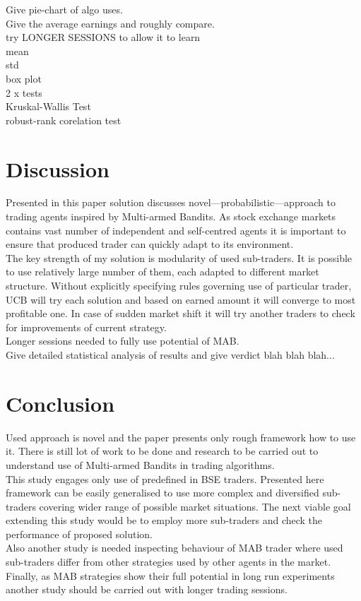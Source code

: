 \documentclass{llncs}
\begin{document}
Give pie-chart of algo uses.\\
Give the average earnings and roughly compare.\\
try LONGER SESSIONS to allow it to learn\\
mean\\
std\\
box plot\\
2 x tests\\
Kruskal-Wallis Test\\
robust-rank corelation test

\section{Discussion}
Presented in this paper solution discusses novel---probabilistic---approach to trading agents inspired by Multi-armed Bandits. As stock exchange markets contains vast number of independent and self-centred agents it is important to ensure that produced trader can quickly adapt to its environment.\\
The key strength of my solution is modularity of used sub-traders. It is possible to use relatively large number of them, each adapted to different market structure. Without explicitly specifying rules governing use of particular trader, UCB will try each solution and based on earned amount it will converge to most profitable one. In case of sudden market shift it will try another traders to check for improvements of current strategy.\\

Longer sessions needed to fully use potential of MAB.\\
Give detailed statistical analysis of results and give verdict blah blah blah...\\

\section{Conclusion}
Used approach is novel and the paper presents only rough framework how to use it. There is still lot of work to be done and research to be carried out to understand use of Multi-armed Bandits in trading algorithms.\\

This study engages only use of predefined in BSE traders. Presented here framework can be easily generalised to use more complex and diversified sub-traders covering wider range of possible market situations. The next viable goal extending this study would be to employ more sub-traders and check the performance of proposed solution.\\
Also another study is needed inspecting behaviour of MAB trader where used sub-traders differ from other strategies used by other agents in the market.\\
Finally, as MAB strategies show their full potential in long run experiments another study should be carried out with longer trading sessions.
\end{document}
